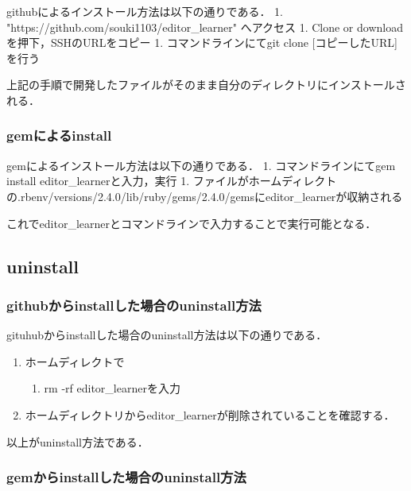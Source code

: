 \documentclass[11pt,dvipdfmx]{jsarticle}
\providecommand{\tightlist}{%
      \setlength{\itemsep}{0pt}\setlength{\parskip}{0pt}}
\begin{document}
githubによるインストール方法は以下の通りである． 1.
"https://github.com/souki1103/editor\_learner" へアクセス 1. Clone or
downloadを押下，SSHのURLをコピー 1. コマンドラインにてgit clone
{[}コピーしたURL{]}を行う

上記の手順で開発したファイルがそのまま自分のディレクトリにインストールされる．

\subsubsection{gemによるinstall}\label{gemux306bux3088ux308binstall}

gemによるインストール方法は以下の通りである． 1. コマンドラインにてgem
install editor\_learnerと入力，実行 1.
ファイルがホームディレクトの.rbenv/versions/2.4.0/lib/ruby/gems/2.4.0/gemsにeditor\_learnerが収納される

これでeditor\_learnerとコマンドラインで入力することで実行可能となる．

    \subsection{uninstall}\label{uninstall}

\subsubsection{githubからinstallした場合のuninstall方法}\label{githubux304bux3089installux3057ux305fux5834ux5408ux306euninstallux65b9ux6cd5}

gituhubからinstallした場合のuninstall方法は以下の通りである．

\begin{enumerate}
\def\labelenumi{\arabic{enumi}.}
\tightlist
\item
  ホームディレクトで

  \begin{enumerate}
  \def\labelenumii{\arabic{enumii}.}
  \setcounter{enumii}{1}
  \tightlist
  \item
    rm -rf editor\_learnerを入力
  \end{enumerate}
\item
  ホームディレクトリからeditor\_learnerが削除されていることを確認する．
\end{enumerate}

以上がuninstall方法である．

\subsubsection{gemからinstallした場合のuninstall方法}\label{gemux304bux3089installux3057ux305fux5834ux5408ux306euninstallux65b9ux6cd5}
\end{document}
